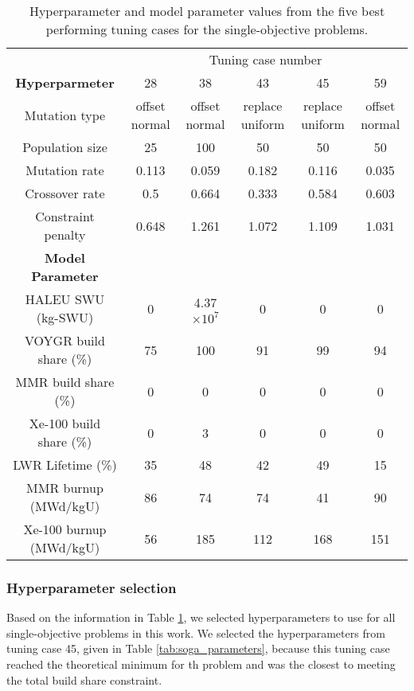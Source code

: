 \begin{table}
    \centering 
    \caption{Hyperparameter and model parameter values from the five best 
    performing tuning cases for the single-objective problems.}
    \label{tab:soga_tuning_results}
    \begin{tabular}{c c c c c c}
        \hline 
        & \multicolumn{5}{c}{Tuning case number} \\
        \textbf{Hyperparmeter} & 28 & 38 & 43 & 45 & 59 \\
        \hline 
        Mutation type & offset normal & offset normal & replace uniform &
        replace uniform & offset normal\\
        Population size & 25 & 100 & 50 & 50 & 50 \\
        Mutation rate & 0.113 & 0.059 & 0.182 & 0.116 & 0.035\\
        Crossover rate & 0.5 & 0.664 & 0.333 & 0.584 & 0.603\\
        Constraint penalty & 0.648 & 1.261 & 1.072 & 1.109 & 1.031\\
        \hline
        \textbf{Model Parameter} \\
        \gls{HALEU} \gls{SWU} (kg-SWU)& 0 & 4.37 $\times 10^7$ & 0 & 0 & 0\\
        VOYGR build share (\%) & 75 & 100 & 91 & 99 & 94\\
        \gls{MMR} build share (\%)& 0 & 0 & 0 & 0 & 0\\
        Xe-100 build share (\%) & 0 & 3 & 0 & 0 & 0\\
        LWR Lifetime (\%)& 35 & 48 & 42 & 49 & 15\\
        \gls{MMR} burnup (MWd/kgU) & 86 & 74 & 74 & 41 & 90\\
        Xe-100 burnup (MWd/kgU) & 56 & 185 & 112 & 168 & 151\\
        \hline 
        
        
    \end{tabular}
\end{table}


\subsubsection{Hyperparameter selection}
Based on the information in Table \ref{tab:soga_tuning_results}, we 
selected hyperparameters to use for all single-objective problems in this 
work. We selected the hyperparameters from tuning case 45, given in 
Table \ref{tab:soga_parameters}, because this tuning case reached the 
theoretical minimum for th problem and was the closest to meeting 
the total build share constraint. 

